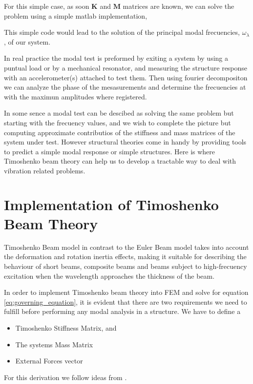 \documentclass[10pt,twoside,a4paper]{article}
\renewcommand{\vec}[1]{\mathbf{#1}}
\begin{document}
For this simple case, as soon $\vec{K}$ and $\vec{M}$ matrices are known, we can solve the problem using a simple matlab implementation,



This simple code would lead to the solution of the principal modal frecuencies, $\omega_\lambda$, of our system.


In real practice the modal test is preformed by exiting a system by using a puntual load or by a mechanical resonator, and measuring the structure response with an accelerometer(s) attached to test them. Then using fourier decompositon we can analyze the phase of the mesasurements and determine the frecuencies at with the maximun amplitudes where registered. 

In some sence a modal test can be descibed as solving the same problem but starting with the frecuency values, and we wish to complete the picture but computing approximate contributios of the stiffness and mass matrices of the system under test. However structural theories come in handy by providing tools to predict a simple modal response or simple structures. Here is where Timoshenko beam theory can help us to develop a tractable way to deal with vibration related problems. 

\section{Implementation of Timoshenko Beam Theory}
Timoshenko Beam model in contrast to the Euler Beam model takes into account the deformation and rotation inertia effects, making it suitable for describing the behaviour of short beams, composite beams and beams subject to high-frecuency excitation when the wavelength approaches the thickness of the beam.

In order to implement Timoshenko beam theory into FEM and solve for equation \ref{eq:governing_equation},  it is evident that there are two requirements we need to fulfill before performing any modal analysis in a structure. We have to define a
\begin{itemize}
         \item Timoshenko Stiffness Matrix, and
         \item The systems Mass Matrix
         \item External Forces vector
\end{itemize}
For this derivation we follow ideas from \cite{Chakraverty2013,ferreira2007,Wiki}.
\end{document}
